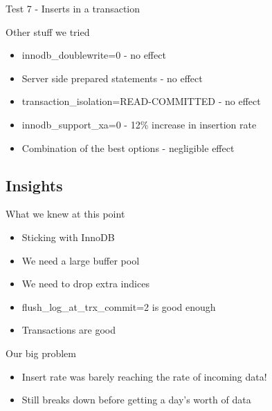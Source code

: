 \documentclass{beamer}
\begin{document}
\begin{frame}{Test 7 - Inserts in a transaction}
\end{frame}

\begin{frame}{Other stuff we tried}
  \begin{itemize}
  \item innodb\_doublewrite=0 - no effect
  \item Server side prepared statements - no effect
  \item transaction\_isolation=READ-COMMITTED - no effect
  \item innodb\_support\_xa=0 - 12\% increase in insertion rate
  \item Combination of the best options - negligible effect
  \end{itemize}
\end{frame}

\subsection{Insights}
\begin{frame}{What we knew at this point}
  \begin{itemize}
  \item Sticking with InnoDB
  \item We need a large buffer pool
  \item We need to drop extra indices
  \item flush\_log\_at\_trx\_commit=2 is good enough
  \item Transactions are good
  \end{itemize}
\end{frame}

\begin{frame}{Our big problem}
  \begin{block}{}
    \begin{itemize}
    \item Insert rate was barely reaching the rate of incoming data!
    \item Still breaks down before getting a day's worth of data
    \end{itemize}
  \end{block}
  \parbox[c][0.4\paperheight]{\paperwidth}{ }
\end{frame}
\end{document}
